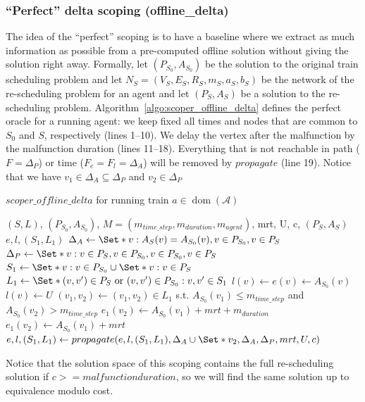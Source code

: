 \documentclass{article}
\DeclareMathOperator{\dom}{dom}
\begin{document}
\subsubsection{``Perfect'' delta scoping (offline\_delta)}
\label{subsubsec:scope_offline_delta}

The idea of the ``perfect'' scoping is to have a baseline where we extract as much information as possible from a pre-computed offline solution without giving the solution right away.
%
Formally, let $(P_{S_0},A_{S_0})$ be the solution to the original train scheduling problem
and let $N_S=(V_S,E_S,R_S,m_S,a_S,b_S)$ be the network of the re-scheduling problem for an agent
and  let $(P_S,A_S)$ be a solution to the re-scheduling problem. Algorithm~\ref{algo:scoper_offline_delta} defines the perfect oracle for a running agent: we keep fixed all times and nodes that are common to $S_0$ and $S$, respectively (lines 1--10).
We delay the vertex after the malfunction by the malfunction duration (lines 11--18).
Everything that is not reachable in path ($F=\Delta_P$) or time ($F_e=F_l=\Delta_A$) will be removed by $propagate$ (line 19). Notice that we have $v_1 \in \Delta_A \subseteq \Delta_P$ and $v_2 \in \Delta_P$


\begin{algorithm}
	\caption{$scoper\_offline\_delta$ for running train $a \in \dom(\mathcal{A})$} \label{algo:scoper_offline_delta}
	\begin{algorithmic}[1]
		\Require $(S,L)$, $(P_{S_0},A_{S_0})$, $M=(m_{time\_step},m_{duration},m_{agent})$, mrt, U, c, $(P_S,A_S)$
	    \Ensure $e,l,(S_1,L_1)$
	    \State $\Delta_A \leftarrow \Set*{v: A_S(v)=A_{S_0}(v), v\in P_{S_0}, v \in P_S}$
	    \State $\Delta_P \leftarrow \Set*{v: v\in P_S, v\in P_{S_0}, v\in P_{S_0}, v \in P_S}$
	    \State $S_1 \leftarrow \Set*{v: v\in P_{S_0}} \cup \Set*{v: v\in P_{S}}$
	    \State $L_1 \leftarrow \Set*{(v,v^\prime) \in P_S \textrm{ or } (v,v^\prime) \in P_{S_0}: v,v^\prime \in S_1}$
	        \State $l(v)\leftarrow e(v)\leftarrow A_{S_0}(v)$
	    \EndFor
	        \State $l(v) \leftarrow U$
	    \EndFor
	    \State $(v_1,v_2) \leftarrow (v_1,v_2) \in L_1$ s.t. $A_{S_0}(v_1)\leq m_{time\_step}$ and $A_{S_0}(v_2)>m_{time\_step}$
            \State $e_1(v_2) \leftarrow A_{S_0}(v_1)+mrt+m_{duration}$
        \Else
            \State $e_1(v_2) \leftarrow A_{S_0}(v_1)+mrt$
        \EndIf
        \EndIf
	    \State $e,l,(S_1,L_1) \leftarrow propagate(e,l,(S_1,L_1),\Delta_A \cup \Set*{v_2}, \Delta_A, \Delta_P, mrt, U, c)$
	\end{algorithmic}
\end{algorithm}
Notice that the solution space of this scoping contains the full re-scheduling solution if $c >= malfunction duration$, so we will find the same solution up to equivalence modulo cost.
\end{document}
